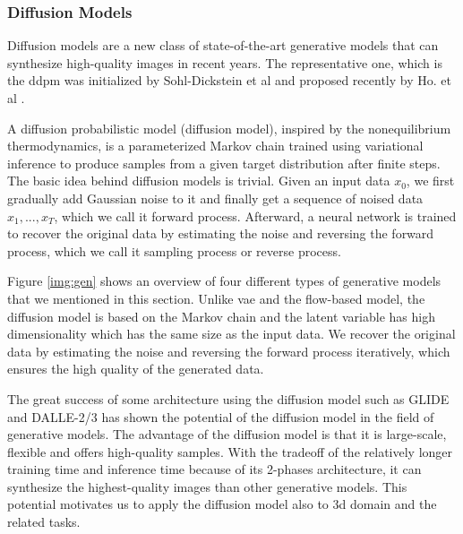 \documentclass[12pt,DIV14,BCOR12mm,a4paper,footinclude=false,headinclude,parskip=half-,twoside,openright,cleardoublepage=empty,toc=index,bibliography=totoc,listof=totoc]{scrreprt}
\numberwithin{equation}{chapter}
\begin{document}
\subsubsection{Diffusion Models}
Diffusion models are a new class of state-of-the-art generative models that can synthesize high-quality images in recent years. The representative one, which is the \gls{ddpm} was initialized by Sohl-Dickstein et al \cite{sohldickstein2015deep} and proposed recently by Ho. et al \cite{ho2020denoising}. 

A diffusion probabilistic model (diffusion model), inspired by the nonequilibrium thermodynamics, is a parameterized Markov chain trained using variational inference to produce samples from a given target distribution after finite steps. The basic idea behind diffusion models is trivial. Given an input data $x_{0}$, we first gradually add Gaussian noise to it and finally get a sequence of noised data $x_{1},...,x_{T}$, which we call it forward process. Afterward, a neural network is trained to recover the original data by estimating the noise and reversing the forward process, which we call it sampling process or reverse process.

Figure \ref{img:gen} shows an overview of four different types of generative models that we mentioned in this section. Unlike \gls{vae} and the flow-based model, the diffusion model is based on the Markov chain and the latent variable has high dimensionality which has the same size as the input data. We recover the original data by estimating the noise and reversing the forward process iteratively, which ensures the high quality of the generated data.

The great success of some architecture using the diffusion model such as GLIDE \cite{nichol2022glide} and DALLE-2/3 \cite{ramesh2022hierarchical} has shown the potential of the diffusion model in the field of generative models. The advantage of the diffusion model is that it is large-scale, flexible and offers high-quality samples. With the tradeoff of the relatively longer training time and inference time because of its 2-phases architecture, it can synthesize the highest-quality images than other generative models. This potential motivates us to apply the diffusion model also to \gls{3d} domain and the related tasks.
\end{document}

